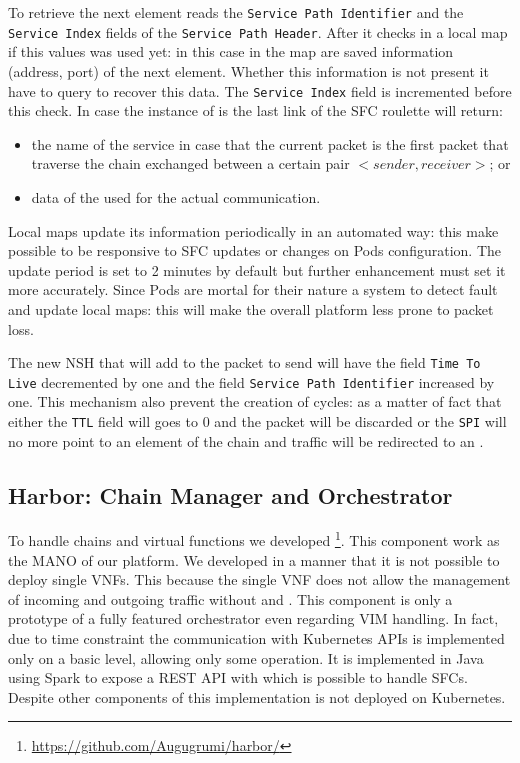 To retrieve the next element \astaire{} reads the \texttt{Service Path
Identifier} and the \texttt{Service Index} fields of the \texttt{Service Path
Header}. After it checks in a local map if this values was used yet: in this
case in the map are saved information (address, port) of the next element.
Whether this information is not present it have to query \roulette{} to recover
this data. The \texttt{Service Index} field is incremented before this check. In
case the instance of \astaire{} is the last link of the SFC roulette will
return:
\begin{itemize}
  \item the name of the \egress{} service in case that the current packet is the
  first packet that traverse the chain exchanged between a certain pair
  $<sender,receiver>$; or
  \item data of the \egress{} used for the actual communication.
\end{itemize}
Local maps update its information periodically in an automated way: this make
possible to be responsive to SFC updates or changes on Pods configuration. The
update period is set to 2 minutes by default but further enhancement must set it
more accurately. Since Pods are mortal for their nature a system to detect fault
and update local maps: this will make the overall platform less prone to packet
loss.

The new NSH that \astaire{} will add to the packet to send will have the field
\texttt{Time To Live} decremented by one and the field \texttt{Service Path
Identifier} increased by one. This mechanism also prevent the creation of
cycles: as a matter of fact that either the \texttt{TTL} field will goes to $0$
and the packet will be discarded or the \texttt{SPI} will no more point to an
element of the chain and traffic will be redirected to an \egress{}.

\subsection{Harbor: Chain Manager and Orchestrator}
To handle chains and virtual functions we developed
\harbor{}\footnote{\url{https://github.com/Augugrumi/harbor/}}. This component
work as the MANO of our platform. We developed \harbor{} in a manner that it
is not possible to deploy single VNFs. This because the single VNF does not
allow the management of incoming and outgoing traffic without \ingresses{} and
\egresses{}. This component is only a prototype of a fully featured orchestrator
even regarding VIM handling. In fact, due to time constraint the communication
with Kubernetes APIs is implemented only on a basic level, allowing only some
operation. It is implemented in Java using Spark to expose a REST API with which
is possible to handle SFCs. Despite other components of this implementation 
\harbor{} is not deployed on Kubernetes.


